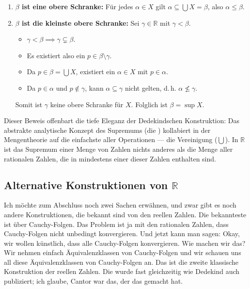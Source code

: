 \begin{math-stroke}
 \begin{enumerate}[label=\textbf{(\arabic*)}] 
    \item \textbf{$\beta$ ist eine obere Schranke:} Für jedes $\alpha \in X$ gilt $\alpha \subseteq \bigcup X = \beta$, also $\alpha \le \beta$.
    \item \textbf{$\beta$ ist die kleinste obere Schranke:} Sei $\gamma \in \mathbb{R}$ mit $\gamma < \beta$.
    \begin{itemize}
        \item $\gamma < \beta \implies \gamma \subsetneq \beta$.
        \item Es existiert also ein $p \in \beta \setminus \gamma$.
        \item Da $p \in \beta = \bigcup X$, existiert ein $\alpha \in X$ mit $p \in \alpha$.
        \item Da $p \in \alpha$ und $p \notin \gamma$, kann $\alpha \subseteq \gamma$ nicht gelten, d.\,h. $\alpha \not\le \gamma$.
    \end{itemize}
    Somit ist $\gamma$ keine obere Schranke für $X$. Folglich ist $\beta = \sup X$.
\end{enumerate}
\end{math-stroke}

\begin{didactic-insight}
Dieser Beweis offenbart die tiefe Eleganz der Dedekindschen Konstruktion: Das abstrakte analytische Konzept des Supremums (die ) kollabiert in der Mengentheorie auf die einfachste aller Operationen --- die Vereinigung ($\bigcup$). In $\mathbb{R}$ ist das Supremum einer Menge von Zahlen nichts anderes als die Menge aller rationalen Zahlen, die in mindestens einer dieser Zahlen enthalten sind.
\end{didactic-insight}

\subsection{Alternative Konstruktionen von \texorpdfstring{$\mathbb{R}$}{R}}

\begin{spoken-clean}[01:21:00 - 01:21:10]
Ich möchte zum Abschluss noch zwei Sachen erwähnen, und zwar gibt es noch andere Konstruktionen, die bekannt sind von den reellen Zahlen. Die bekannteste ist über Cauchy-Folgen. Das Problem ist ja mit den rationalen Zahlen, dass Cauchy-Folgen nicht unbedingt konvergieren. Und jetzt kann man sagen: Okay, wir wollen künstlich, dass alle Cauchy-Folgen konvergieren. Wie machen wir das? Wir nehmen einfach Äquivalenzklassen von Cauchy-Folgen und wir schauen uns all diese Äquivalenzklassen von Cauchy-Folgen an. Das ist die zweite klassische Konstruktion der reellen Zahlen. Die wurde fast gleichzeitig wie Dedekind auch publiziert; ich glaube, Cantor war das, der das gemacht hat.
\end{spoken-clean}

